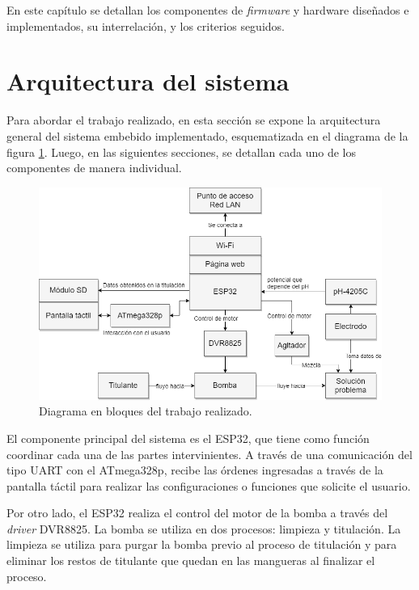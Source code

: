 En este capítulo se detallan los componentes de \textit{firmware} y hardware diseñados e implementados, su interrelación, y los criterios seguidos.

\section{Arquitectura del sistema}

Para abordar el trabajo realizado, en esta sección se expone la arquitectura general del sistema embebido implementado, esquematizada en el diagrama de la figura \ref{fig:diagramaCompleto}. Luego, en las siguientes secciones, se detallan cada uno de los componentes de manera individual.

\begin{figure}[htbp]
	\centering
	\includegraphics[width=1.0\textwidth]{./Figures/DiagramaBloquesCompleto.png}
	\caption{Diagrama en bloques del trabajo realizado.}
	\label{fig:diagramaCompleto}
\end{figure}

El componente principal del sistema es el ESP32, que tiene como función coordinar cada una de las partes intervinientes. A través de una comunicación del tipo UART con el ATmega328p, recibe las órdenes ingresadas a través de la pantalla táctil para realizar las configuraciones o funciones que solicite el usuario.

Por otro lado, el ESP32 realiza el control del motor de la bomba a través del \textit{driver} DVR8825. La bomba se utiliza en dos procesos: limpieza y titulación. La limpieza se utiliza para purgar la bomba previo al proceso de titulación y para eliminar los restos de titulante que quedan en las mangueras al finalizar el proceso.

